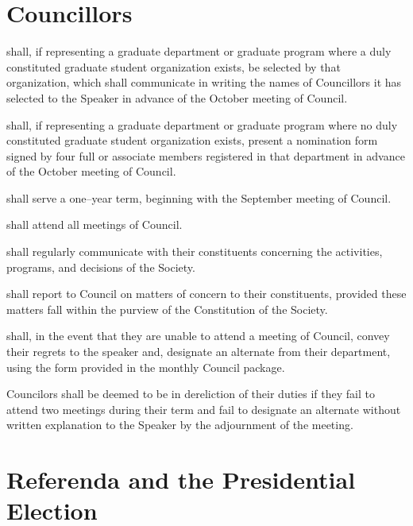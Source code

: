 \newpage


\section{Councillors}
\begin{longenum}[ label*=\thesection.\arabic*., align=left]
	\item shall, if representing a graduate department or graduate program where a duly constituted graduate student organization exists, be selected by that organization, which shall communicate in writing the names of Councillors it has selected to the Speaker in advance of the October meeting of Council. 
    \item shall, if representing a graduate department or graduate program where no duly constituted graduate student organization  exists, present a nomination form signed by four full or associate members registered in that department in advance of the October meeting of Council. 
    \item shall serve a one--year term, beginning with the September meeting of Council. 
    \item shall attend all meetings of Council.
    \item shall regularly communicate with their constituents concerning the activities, programs, and decisions of the Society. 
    \item shall report to Council on matters of concern to their constituents, provided these matters fall within the purview of the Constitution of the Society. 
    \item shall, in the event that they are unable to attend a meeting of Council, convey their regrets to the speaker and, designate an alternate from their department, using the form provided in the monthly Council package.
    \item Councilors shall be deemed to be in dereliction of their duties if they fail to attend two meetings during their term and fail to designate an alternate without written explanation to the Speaker by the adjournment  of the meeting. 
\end{longenum}
\newpage
\section{Referenda and the Presidential Election}
 

